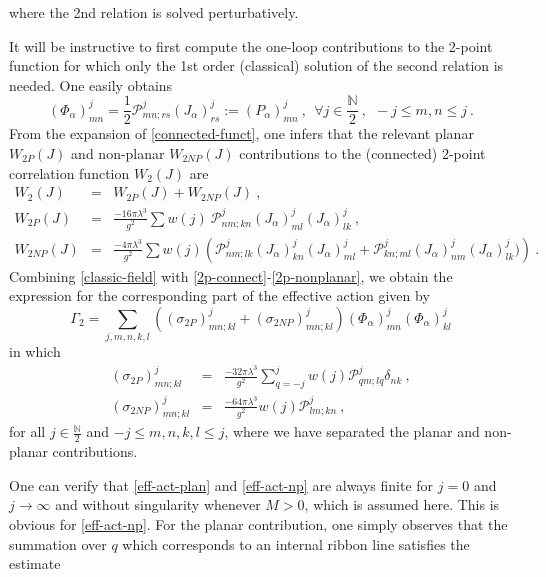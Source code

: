 \documentclass[a4paper,11pt,twoside]{article}
\numberwithin{equation}{section}
\theoremstyle{nonumberplain}
\newcounter{and}
\begin{document}
%
where the 2nd relation is solved perturbatively.\par%
%
It will be instructive to first compute the one-loop contributions to the 2-point function for which only the 1st order (classical) solution of the second relation is needed. One easily obtains%
%
\begin{equation}
(\Phi_\alpha)^j_{mn} = \frac{1}{2} \mathcal{P}^j_{mn;rs}(J_\alpha)^j_{rs}
:= (P_\alpha)^j_{mn} \ , \ \ \forall j\in\frac{\mathbb{N}}{2} \ , \ \ -j\le m,n\le j \ . \label{classic-field}
\end{equation}
%
From the expansion of \eqref{connected-funct}, one infers that the relevant planar $W_{2P}(J)$ and non-planar $W_{2NP}(J)$ contributions to the (connected) 2-point correlation function $W_2(J)$ are%
%
\begin{eqnarray}
%
W_2(J) &=& W_{2P}(J) + W_{2NP}(J) \label{2p-connect} \ , \\
%
W_{2P}(J) &=& \frac{-16\pi\lambda^3}{g^2} \sum w(j) \ \mathcal{P}^j_{nm;kn} (J_\alpha)^j_{ml}(J_\alpha)^j_{lk} \ , \label{2p-planar} \\
%
W_{2NP}(J) &=& \frac{-4\pi\lambda^3}{g^2} \sum w(j) \left( \mathcal{P}^j_{nm;lk} (J_\alpha)^j_{kn}(J_\alpha)^j_{ml} + \mathcal{P}^j_{kn;ml}(J_\alpha)^j_{nm} (J_\alpha)^j_{lk}) \right) \ . \label{2p-nonplanar}
%
\end{eqnarray}
%
Combining \eqref{classic-field} with \eqref{2p-connect}-\eqref{2p-nonplanar}, we obtain the expression for the corresponding part of the effective action given by%
%
\begin{equation}
\Gamma_{2} = \sum_{j,m,n,k,l} \left((\sigma_{2P})^j_{mn;kl} + (\sigma_{2NP})^j_{mn;kl}\right)(\Phi_\alpha)^j_{mn} (\Phi_\alpha)^j_{kl}\label{effect-action-1loop}
\end{equation}
in which
\begin{eqnarray}
%
(\sigma_{2P})^j_{mn;kl} &=& \frac{-32\pi\lambda^3}{g^2} \sum_{q=-j}^j w(j) \mathcal{P}^j_{qm;lq} \delta_{nk} \ , \label{eff-act-plan} \\
%
(\sigma_{2NP})^j_{mn;kl} &=& \frac{-64\pi\lambda^3}{g^2} w(j) \mathcal{P}^j_{lm;kn} \ , \label{eff-act-np}
%
\end{eqnarray}
%
for all $j\in\frac{\mathbb{N}}{2}$ and $-j\le m,n,k,l\le j$, where we have separated the planar and non-planar contributions.\par%
%
One can verify that \eqref{eff-act-plan} and \eqref{eff-act-np} are always finite for $j=0$ and $j\to\infty$ and without singularity whenever $M>0$, which is assumed here. This is obvious for \eqref{eff-act-np}. For the planar contribution, one simply observes that the summation over $q$ which corresponds to an internal ribbon line satisfies the estimate%
\end{document}
